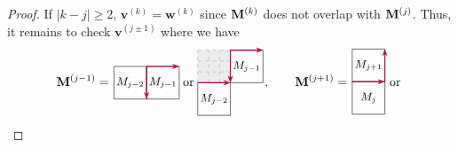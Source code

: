 \documentclass[12pt]{amsart}
\newcommand{\bs}{\boldsymbol}
\newcommand{\cell}{.28}
\newcommand{\phantomtile}[5]{%
\begin{scope}[shift={(#1,#2)}]
  \fill[gray!15] (0,0) rectangle ({#3*\cell},{#4*\cell});
  \draw[gray!70, dashed, step=\cell] (0,0) grid ({#3*\cell},{#4*\cell});
  #5
\end{scope}
}
\theoremstyle{definition}
\theoremstyle{remark}
\begin{document}
\begin{proof}
If $|k-j|\geq 2$, ${\bs v}^{(k)} = {\bs w}^{(k)}$ since ${\bf M}^{(k)}$ does not overlap with ${\bf M}^{(j)}$.
Thus, it remains to check ${\bs v}^{(j\pm 1)}$ where we have
\[
{\bf M}^{(j-1)} =
\vcenter{\hbox{\begin{tikzpicture}[scale=1.1, baseline=-.5ex]

\draw (0,0) rectangle (.84,.84);
\node at (.42,.42) {\small{$M_{j-2}$}};

\draw (.84,0) rectangle (1.68,.84);
\node at (1.26,0.42) {\small{$M_{j-1}$}};

\draw[purple, -{Stealth[length=2mm,width=1.5mm]}, thick] (.84,.84) -- (.84,0);
\draw[purple, -{Stealth[length=2mm,width=1.5mm]}, thick] (.84,.84) -- (1.68,.84);
\end{tikzpicture}}}
\,\text{or}\,
\vcenter{\hbox{\begin{tikzpicture}[scale=1.1, baseline=-.5ex]

\draw (0,0) rectangle (.84,.84);
\node at (.42,.42) {\small{$M_{j-2}$}};

{\phantomtile{0}{.84}{3}{3}{
}}

\draw (.84,.84) rectangle (1.68,1.68);
\node at (1.26,1.26) {\small{$M_{j-1}$}};


\draw[purple, -{Stealth[length=2mm,width=1.5mm]}, thick] (0,.84) -- (.84,.84);
\draw[purple, -{Stealth[length=2mm,width=1.5mm]}, thick] (.84,1.68) -- (.84,.84);
\draw[purple, -{Stealth[length=2mm,width=1.5mm]}, thick] (.84,1.68) -- (1.68,1.68);
\end{tikzpicture}}},
\qquad
{\bf M}^{(j+1)} =\vcenter{\hbox{\begin{tikzpicture}[scale=1.1, baseline=-.5ex]

\draw (0,0) rectangle (.84,.84);
\node at (.42,.42) {\small{$M_{j}$}};

\draw (0,.84) rectangle (.84,1.68);
\node at (0.42,1.26) {\small{$M_{j+1}$}};

\draw[purple, -{Stealth[length=2mm,width=1.5mm]}, thick] (0,.84) -- (.84,.84);
\draw[purple, -{Stealth[length=2mm,width=1.5mm]}, thick] (.84,.84) -- (.84,1.68);
\end{tikzpicture}}}
\,\text{or} \,\, \vcenter{\hbox{\begin{tikzpicture}[scale=1.1, baseline=-.5ex]


\end{tikzpicture}}}\]
\end{proof}
\end{document}
